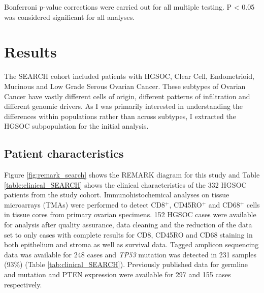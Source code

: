 Bonferroni p-value corrections were carried out for all multiple testing. P < 0.05 was considered significant for all analyses. 


\section{Results}
 
 The SEARCH cohort included patients with HGSOC, Clear Cell, Endometrioid, Mucinous and Low Grade Serous Ovarian Cancer. These subtypes of Ovarian Cancer have vastly different cells of origin, different patterns of infiltration and different genomic drivers. As I was primarily interested in understanding the differences within populations rather than across subtypes, I extracted the HGSOC subpopulation for the initial analysis.

\subsection{Patient characteristics}
Figure {\ref{fig:remark_search}} shows the REMARK diagram for this study and Table \ref{table:clinical_SEARCH} shows the clinical characteristics of the 332 HGSOC patients from the study cohort. Immunohistochemical analyses on tissue microarrays (TMAs) were performed to detect CD8$^+$, CD45RO$^+$ and CD68$^+$ cells in tissue cores from primary ovarian specimens.  152 HGSOC cases were available for analysis after quality assurance, data cleaning and the reduction of the data set to only cases with complete results for CD8, CD45RO and CD68 staining in both epithelium and stroma as well as survival data. 
Tagged amplicon sequencing data was available for 248 cases and \textit{TP53} mutation was detected in 231 samples (93\%) (Table \ref{tab:clinical_SEARCH}). Previously published data for germline   and  mutation and PTEN expression were available for 297 and 155 cases respectively\cite{17,20}.

